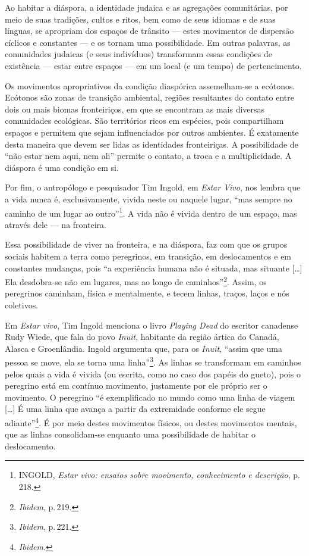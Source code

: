 Ao habitar a diáspora, a identidade judaica e as agregações
comunitárias, por meio de suas tradições, cultos e ritos, bem como de
seus idiomas e de suas línguas, se apropriam dos espaços de trânsito ---
estes movimentos de dispersão cíclicos e constantes --- e os tornam uma
possibilidade. Em outras palavras, as comunidades judaicas (e seus
indivíduos) transformam essas condições de existência --- estar entre
espaços --- em um local (e um tempo) de pertencimento.

Os movimentos apropriativos da condição diaspórica assemelham-se a
ecótonos. Ecótonos são zonas de transição ambiental, regiões resultantes
do contato entre dois ou mais biomas fronteiriços, em que se encontram
as mais diversas comunidades ecológicas. São territórios ricos em
espécies, pois compartilham espaços e permitem que sejam influenciados
por outros ambientes. É exatamente desta maneira que devem ser lidas as
identidades fronteiriças. A possibilidade de ``não estar nem aqui, nem
ali'' permite o contato, a troca e a multiplicidade. A diáspora é uma
condição em si.

Por fim, o antropólogo e pesquisador Tim Ingold, em \emph{Estar Vivo},
nos lembra que a vida nunca é, exclusivamente, vivida neste ou naquele
lugar, ``mas sempre no caminho de um lugar ao outro''\footnote{INGOLD,
  \emph{Estar vivo: ensaios sobre movimento, conhecimento e descrição},
  p.\,218.}. A vida não é vivida dentro de um espaço, mas através dele
--- na fronteira.

Essa possibilidade de viver na fronteira, e na diáspora, faz com que os
grupos sociais habitem a terra como peregrinos, em transição, em
deslocamentos e em constantes mudanças, pois ``a experiência humana
não é situada, mas situante {[}\ldots{}{]} Ela desdobra-se não em lugares,
mas ao longo de caminhos''\footnote{\emph{Ibidem}, p.\,219.}. Assim, os
peregrinos caminham, física e mentalmente, e tecem linhas, traços, laços
e nós coletivos.

Em \emph{Estar vivo}, Tim Ingold menciona o livro \emph{Playing Dead} do
escritor canadense Rudy Wiede, que fala do povo \emph{Inuit}, habitante
da região ártica do Canadá, Alasca e Groenlândia. Ingold argumenta que,
para os \emph{Inuit}, ``assim que uma pessoa se move, ela se torna
uma linha''\footnote{\emph{Ibidem}, p.\,221.}. As linhas se transformam em
caminhos pelos quais a vida é vivida (ou escrita, como no caso dos
papéis do gueto), pois o peregrino está em contínuo movimento,
justamente por ele próprio ser o movimento. O peregrino ``é
exemplificado no mundo como uma linha de viagem {[}\ldots{}{]} É uma linha
que avança a partir da extremidade conforme ele segue
adiante''\footnote{\emph{Ibidem}.}. É por meio destes movimentos físicos, ou
destes movimentos mentais, que as linhas consolidam-se enquanto uma
possibilidade de habitar o deslocamento.

